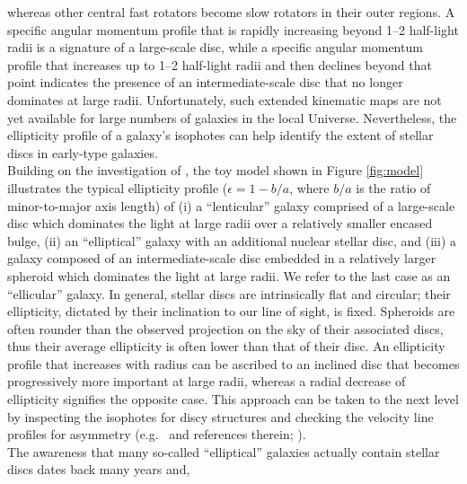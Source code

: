 \documentclass[useAMS,usenatbib,article]{mnras}
\begin{document}
whereas other central fast rotators become slow rotators in their outer regions.
A specific angular momentum profile that is rapidly increasing beyond 1--2 half-light radii 
is a signature of a large-scale disc, 
while a specific angular momentum profile that increases up to 1--2 half-light radii and then declines beyond that point 
indicates the presence of an intermediate-scale disc that no longer dominates at large radii. 
Unfortunately, such extended kinematic maps are not yet available for large numbers of galaxies in the local Universe. 
Nevertheless, the ellipticity profile of a galaxy's isophotes can help identify the extent of stellar discs in early-type galaxies. \\
Building on the investigation of \cite{rixwhite1990}, 
the toy model shown in Figure \ref{fig:model} illustrates the typical ellipticity profile 
($\epsilon = 1 - b/a$, where $b/a$ is the ratio of minor-to-major axis length) of 
(i) a ``lenticular'' galaxy comprised of a large-scale disc which dominates the light at large radii over a relatively smaller encased bulge, 
(ii) an ``elliptical'' galaxy with an additional nuclear stellar disc, 
and (iii) a galaxy composed of an intermediate-scale disc embedded in a relatively larger spheroid 
which dominates the light at large radii. 
We refer to the last case as an ``ellicular'' galaxy. 
In general, stellar discs are intrinsically flat and circular; 
their ellipticity, dictated by their inclination to our line of sight, is fixed. 
Spheroids are often rounder than the observed projection on the sky of their associated discs, 
thus their average ellipticity is often lower than that of their disc. 
An ellipticity profile that increases with radius can be ascribed to an inclined disc that becomes progressively more important at large radii, 
whereas a radial decrease of ellipticity signifies the opposite case. 
This approach can be taken to the next level by inspecting the isophotes for discy structures and checking the velocity line profiles for asymmetry 
(e.g.~\citealt{scorzabender1995} and references therein; \citealt{scorza1998}). \\
The awareness that many so-called ``elliptical'' galaxies actually contain stellar discs 
dates back many years 
\citep{michard1984,djorgovski1985,carter1987,capaccioli1987,capaccioli1988,franx1989,nieto1988,nieto1991,rixwhite1990,rixwhite1992,
vandenbergh1990,bender1990,scorzabender1990,scorzabender1995,
simienmichard1990,cinzanovandermarel1993,donofrio1995,graham1998fornax,scorza1998,scorzavandenbosch1998,bendersaglia1999} and, 
\end{document}
